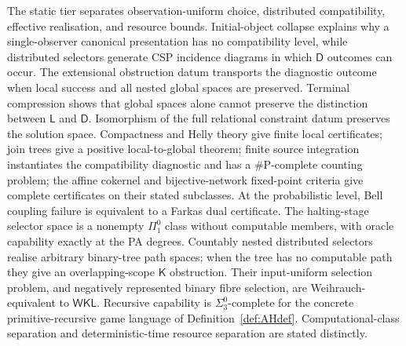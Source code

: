 \documentclass[11pt]{article}
\theoremstyle{plain}
\theoremstyle{definition}
\theoremstyle{remark}
\begin{document}
The static tier separates observation-uniform choice, distributed compatibility,
effective realisation, and resource bounds. Initial-object collapse explains
why a single-observer canonical presentation has no compatibility
level, while distributed selectors generate CSP incidence diagrams in which
$\mathsf D$ outcomes can occur.
The extensional obstruction datum transports the diagnostic outcome when local
success and all nested global spaces are preserved. Terminal compression shows
that global spaces alone cannot preserve the distinction between $\mathsf L$
and $\mathsf D$. Isomorphism of the full relational constraint datum preserves
the solution space. Compactness and Helly theory give finite local certificates;
join trees give a positive local-to-global theorem; finite source integration
instantiates the compatibility diagnostic and has a $\#\mathrm P$-complete
counting problem; the affine cokernel and bijective-network fixed-point criteria
give complete certificates on their stated subclasses.
At the probabilistic level, Bell coupling failure is equivalent to a Farkas dual
certificate. The halting-stage selector space is a nonempty $\Pi^0_1$ class
without computable members, with oracle capability exactly at the PA degrees.
Countably nested distributed selectors realise arbitrary binary-tree path spaces;
when the tree has no computable path they give an overlapping-scope
$\mathsf K$ obstruction. Their input-uniform selection problem, and negatively
represented binary fibre selection, are Weihrauch-equivalent to $\mathsf{WKL}$.
Recursive capability is $\Sigma^0_3$-complete for the concrete
primitive-recursive game language of Definition~\ref{def:AHdef}. Computational-class separation and
deterministic-time resource separation are stated distinctly.
\end{document}
